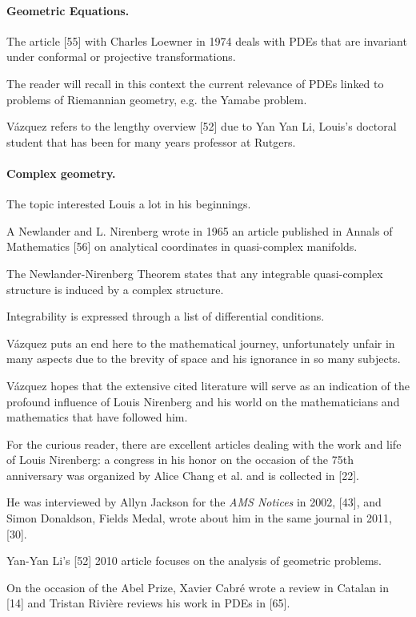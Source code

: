 \documentclass{article}
\begin{document}
\paragraph{Geometric Equations.} The article [55] with Charles Loewner in 1974 deals with PDEs that are invariant under conformal or projective transformations.

The reader will recall in this context the current relevance of PDEs linked to problems of Riemannian geometry, e.g. the Yamabe problem.

V\'azquez refers to the lengthy overview [52] due to Yan Yan Li, Louis's doctoral student that has been for many years professor at Rutgers.

\paragraph{Complex geometry.} The topic interested Louis a lot in his beginnings.

A Newlander and L. Nirenberg wrote in 1965 an article published in Annals of Mathematics [56] on analytical coordinates in quasi-complex manifolds.

The Newlander-Nirenberg Theorem states that any integrable quasi-complex structure is induced by a complex structure.

Integrability is expressed through a list of differential conditions.

%
V\'azquez puts an end here to the mathematical journey, unfortunately unfair in many aspects due to the brevity of space and his ignorance in so many subjects.

V\'azquez hopes that the extensive cited literature will serve as an indication of the profound influence of Louis Nirenberg and his world on the mathematicians and mathematics that have followed him.

For the curious reader, there are excellent articles dealing with the work and life of Louis Nirenberg: a congress in his honor on the occasion of the 75th anniversary was organized by Alice Chang et al. and is collected in [22].

He was interviewed by Allyn Jackson for the \textit{AMS Notices} in 2002, [43], and Simon Donaldson, Fields Medal, wrote about him in the same journal in 2011, [30].

Yan-Yan Li's [52] 2010 article focuses on the analysis of geometric problems.

On the occasion of the Abel Prize, Xavier Cabré wrote a review in Catalan in [14] and Tristan Rivi\`ere reviews his work in PDEs in [65].
\end{document}
